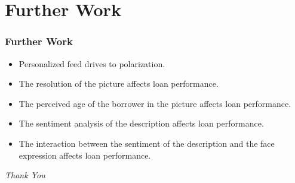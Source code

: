 \documentclass{beamer}
\begin{document}
\section{Further Work} 
\begin{frame}\frametitle{Further Work}
\begin{itemize}
\item Personalized feed drives to polarization. 
\item The resolution of the picture affects loan performance.
\item The perceived age of the borrower in the picture affects loan performance.
\item The sentiment analysis of the description affects loan performance.
\item The interaction between the sentiment of the description and the face expression affects loan performance.
\end{itemize}
\end{frame}

% 

\begin{frame}[plain]{}
  \centering \Huge
  \emph{Thank You}
\end{frame}
\end{document}
